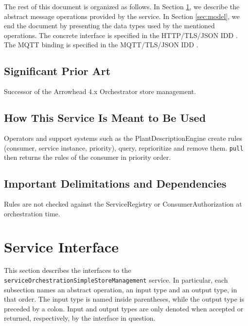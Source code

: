 \documentclass[a4paper]{arrowhead}
\begin{document}
The rest of this document is organized as follows.
In Section \ref{sec:operations}, we describe the abstract message operations provided by the service.
In Section \ref{sec:model}, we end the document by presenting the data types used by the mentioned operations.
The concrete interface is specified in the HTTP/TLS/JSON IDD \cite{ssso-serviceOrchestrationSimpleStoreManagement-http-idd}. The MQTT binding is specified in the MQTT/TLS/JSON IDD \cite{ssso-serviceOrchestrationSimpleStoreManagement-mqtt-idd}.

\subsection{Significant Prior Art}

Successor of the Arrowhead 4.x Orchestrator store management.

\subsection{How This Service Is Meant to Be Used}

Operators and support systems such as the Plant\allowbreak{}Description\allowbreak{}Engine create rules (consumer, service instance, priority), query, reprioritize and remove them. \texttt{pull} then returns the rules of the consumer in priority order.

\subsection{Important Delimitations and Dependencies}
\label{sec:delimitations}

Rules are not checked against the ServiceRegistry or Consumer\allowbreak{}Authorization at orchestration time.

\newpage

\section{Service Interface}
\label{sec:operations}

This section describes the interfaces to the \texttt{service\allowbreak{}Orchestration\allowbreak{}Simple\allowbreak{}Store\allowbreak{}Management} service.
In particular, each subsection names an abstract operation, an input type and an output type, in that order.
The input type is named inside parentheses, while the output type is preceded by a colon.
Input and output types are only denoted when accepted or returned, respectively, by the interface in question.
\end{document}
